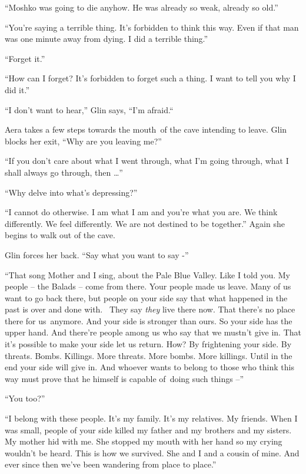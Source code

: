 \documentclass[twoside,11pt]{book}
\begin{document}
``Moshko was going to die anyhow. He was already so weak, already so old.'' 

``You're saying a terrible thing. It's forbidden to think this way. Even if that man was one minute away
from dying. I did a terrible thing.'' 

``Forget it.'' 

``How can I forget? It's forbidden to forget such a thing. I want to tell you why I did it.'' 

``I don't want to hear,'' Glin says, ``I'm afraid.``\ 

Aera takes a few steps towards the mouth{\ }of the cave intending to leave. Glin blocks her exit,
``Why are you leaving me?'' 

``If you don't care about what I went through, what I'm going through, what I shall always go through, then
{\dots}'' 

``Why delve into what's depressing?'' 

``I cannot do otherwise. I am what I am and you're what you are. We think differently. We feel differently.
We are not destined to be together.'' Again she begins to walk out of the cave. 

Glin forces her back. ``Say what you want to say -'' 

``That song Mother and I sing, about the Pale Blue Valley. Like I told you. My people -- the Balads -- come
from there. Your people made us leave. Many of us want to go back there, but people on your side say that what happened
in the past is over and done with. ~They say \textit{they }live there now. That there's no place there for us~anymore.
And your side is stronger than ours. So your side has the upper hand. And there're people among us who say that we
mustn't give in. That it's possible to make your side let us return. How? By frightening your side. By threats. Bombs.
Killings. More threats. More bombs. More killings. Until in the end your side will give in. And whoever wants to belong
to those who think this way must prove that he himself is capable of~doing such things --'' 

``You too?'' 

``I belong with these people. It's my family. It's my relatives. My friends. When I was small, people of
your side killed my father and my brothers and my sisters. My mother hid with me. She stopped my mouth with her hand so
my crying wouldn't be heard. This is how we survived. She and I and a cousin of mine. And ever since then we've been
wandering from place to place.'' 
\end{document}

